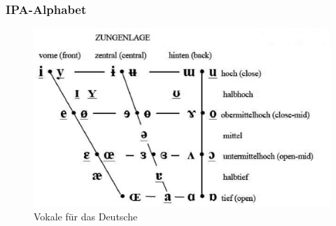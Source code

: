 
\begin{frame}
\frametitle{IPA-Alphabet}

	\begin{figure}[H]
		\centering
		
		\includegraphics[scale=0.5]{material/04ipatabellerepp11vokalviereck}
		\caption{Vokale für das Deutsche}
	\end{figure}
	
\end{frame}



